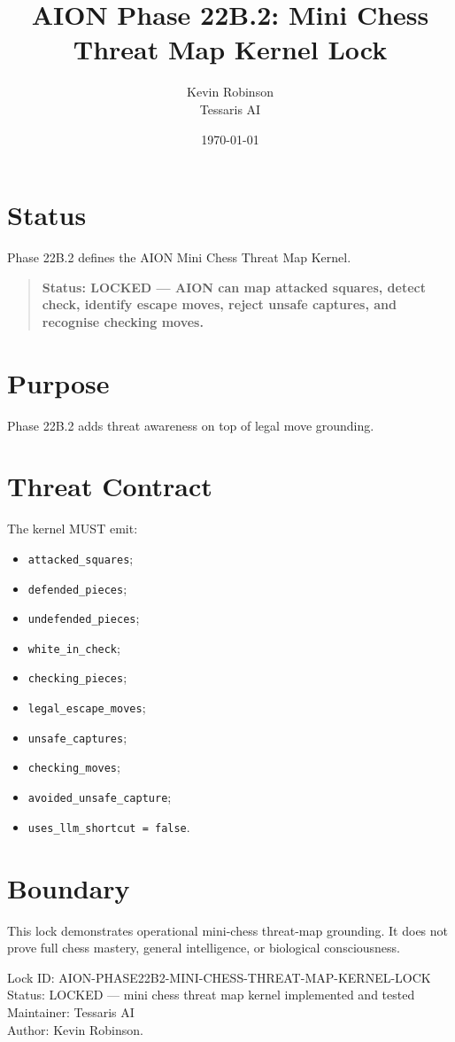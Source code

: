 \documentclass[11pt,a4paper]{article}
\title{\textbf{AION Phase 22B.2: Mini Chess Threat Map Kernel Lock}}
\author{Kevin Robinson\\Tessaris AI}
\date{\today}
\begin{document}
\maketitle

\section{Status}

Phase 22B.2 defines the AION Mini Chess Threat Map Kernel.

\begin{quote}
\textbf{Status: LOCKED --- AION can map attacked squares, detect check, identify escape moves, reject unsafe captures, and recognise checking moves.}
\end{quote}

\section{Purpose}

Phase 22B.2 adds threat awareness on top of legal move grounding.

\section{Threat Contract}

The kernel MUST emit:

\begin{itemize}
  \item \texttt{attacked\_squares};
  \item \texttt{defended\_pieces};
  \item \texttt{undefended\_pieces};
  \item \texttt{white\_in\_check};
  \item \texttt{checking\_pieces};
  \item \texttt{legal\_escape\_moves};
  \item \texttt{unsafe\_captures};
  \item \texttt{checking\_moves};
  \item \texttt{avoided\_unsafe\_capture};
  \item \texttt{uses\_llm\_shortcut = false}.
\end{itemize}

\section{Boundary}

This lock demonstrates operational mini-chess threat-map grounding. It does not prove full chess mastery, general intelligence, or biological consciousness.

\bigskip

\noindent
Lock ID: AION-PHASE22B2-MINI-CHESS-THREAT-MAP-KERNEL-LOCK\\
Status: LOCKED --- mini chess threat map kernel implemented and tested\\
Maintainer: Tessaris AI\\
Author: Kevin Robinson.
\end{document}
